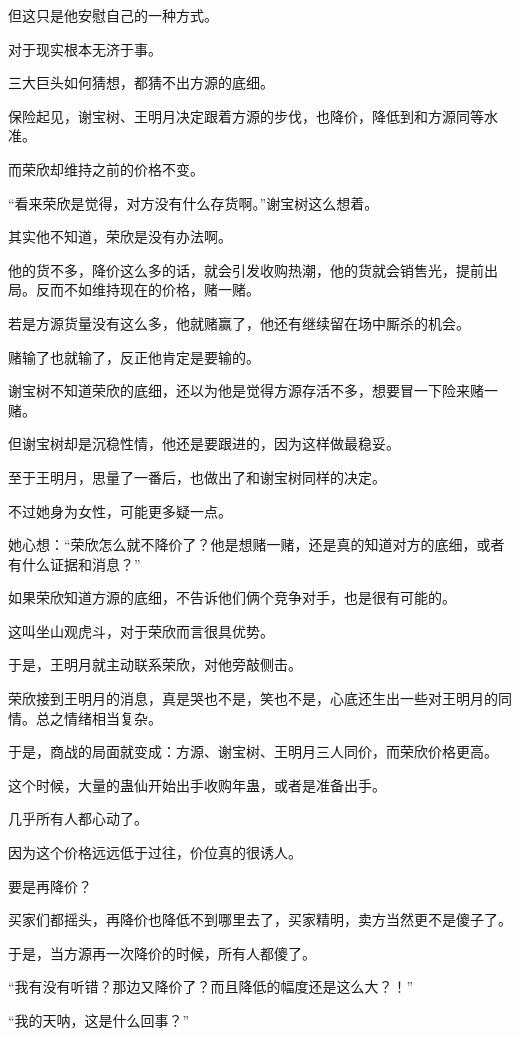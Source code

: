 \begin{this_body}
但这只是他安慰自己的一种方式。

对于现实根本无济于事。

三大巨头如何猜想，都猜不出方源的底细。

保险起见，谢宝树、王明月决定跟着方源的步伐，也降价，降低到和方源同等水准。

而荣欣却维持之前的价格不变。

“看来荣欣是觉得，对方没有什么存货啊。”谢宝树这么想着。

其实他不知道，荣欣是没有办法啊。

他的货不多，降价这么多的话，就会引发收购热潮，他的货就会销售光，提前出局。反而不如维持现在的价格，赌一赌。

若是方源货量没有这么多，他就赌赢了，他还有继续留在场中厮杀的机会。

赌输了也就输了，反正他肯定是要输的。

谢宝树不知道荣欣的底细，还以为他是觉得方源存活不多，想要冒一下险来赌一赌。

但谢宝树却是沉稳性情，他还是要跟进的，因为这样做最稳妥。

至于王明月，思量了一番后，也做出了和谢宝树同样的决定。

不过她身为女性，可能更多疑一点。

她心想：“荣欣怎么就不降价了？他是想赌一赌，还是真的知道对方的底细，或者有什么证据和消息？”

如果荣欣知道方源的底细，不告诉他们俩个竞争对手，也是很有可能的。

这叫坐山观虎斗，对于荣欣而言很具优势。

于是，王明月就主动联系荣欣，对他旁敲侧击。

荣欣接到王明月的消息，真是哭也不是，笑也不是，心底还生出一些对王明月的同情。总之情绪相当复杂。

于是，商战的局面就变成：方源、谢宝树、王明月三人同价，而荣欣价格更高。

这个时候，大量的蛊仙开始出手收购年蛊，或者是准备出手。

几乎所有人都心动了。

因为这个价格远远低于过往，价位真的很诱人。

要是再降价？

买家们都摇头，再降价也降低不到哪里去了，买家精明，卖方当然更不是傻子了。

于是，当方源再一次降价的时候，所有人都傻了。

“我有没有听错？那边又降价了？而且降低的幅度还是这么大？！”

“我的天呐，这是什么回事？”


\end{this_body}
